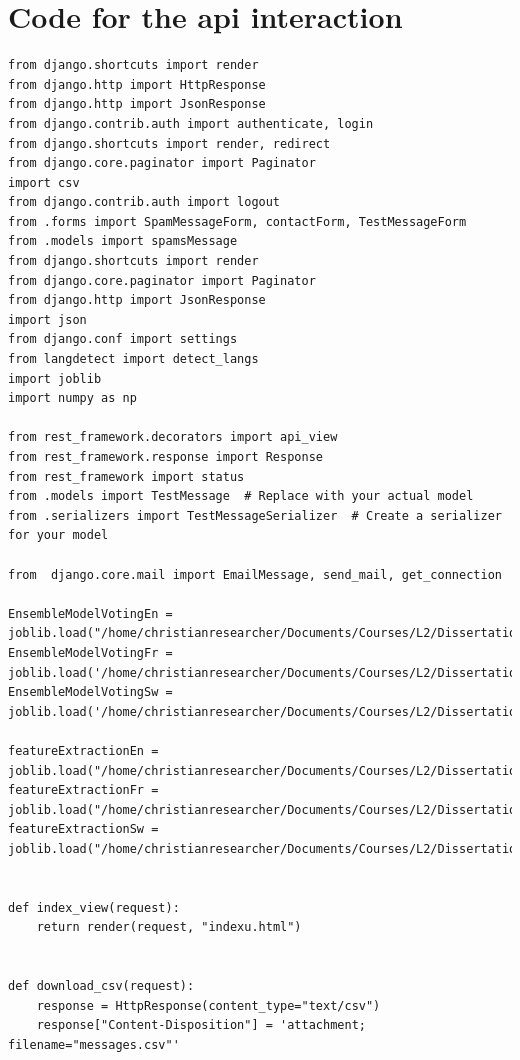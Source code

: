 \documentclass[12pt,a4paper, oneside]{book}
\begin{document}
\section{Code for the api interaction} 

\begin{lstlisting}[style=stylejupyter]
from django.shortcuts import render
from django.http import HttpResponse
from django.http import JsonResponse
from django.contrib.auth import authenticate, login
from django.shortcuts import render, redirect
from django.core.paginator import Paginator
import csv
from django.contrib.auth import logout
from .forms import SpamMessageForm, contactForm, TestMessageForm
from .models import spamsMessage 
from django.shortcuts import render
from django.core.paginator import Paginator
from django.http import JsonResponse
import json
from django.conf import settings
from langdetect import detect_langs 
import joblib 
import numpy as np

from rest_framework.decorators import api_view
from rest_framework.response import Response
from rest_framework import status
from .models import TestMessage  # Replace with your actual model
from .serializers import TestMessageSerializer  # Create a serializer for your model

from  django.core.mail import EmailMessage, send_mail, get_connection

EnsembleModelVotingEn = joblib.load("/home/christianresearcher/Documents/Courses/L2/Dissertation/spamDetectionApp/project/static/models/EnglishModelPrediction.pkl")
EnsembleModelVotingFr = joblib.load('/home/christianresearcher/Documents/Courses/L2/Dissertation/spamDetectionApp/project/static/models/FrenchModelPrediction.pkl')
EnsembleModelVotingSw = joblib.load('/home/christianresearcher/Documents/Courses/L2/Dissertation/spamDetectionApp/project/static/models/SwahiliModelPrediction.pkl')

featureExtractionEn = joblib.load("/home/christianresearcher/Documents/Courses/L2/Dissertation/spamDetectionApp/project/static/models/EnglishFeatureModel.pkl") 
featureExtractionFr = joblib.load("/home/christianresearcher/Documents/Courses/L2/Dissertation/spamDetectionApp/project/static/models/FrenchFeatureModel.pkl")
featureExtractionSw = joblib.load("/home/christianresearcher/Documents/Courses/L2/Dissertation/spamDetectionApp/project/static/models/SwahiliFeatureModel.pkl")


def index_view(request):
	return render(request, "indexu.html")


def download_csv(request):
	response = HttpResponse(content_type="text/csv")
	response["Content-Disposition"] = 'attachment; filename="messages.csv"'
	

\end{lstlisting}
\end{document}
